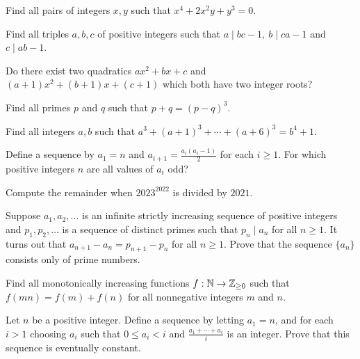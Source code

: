 \begin{problem}{\label{p:i:n:pr:71}}
  Find all pairs of integers $x,y$ such that $x^4+2x^2y+y^3=0$.
\end{problem}
\begin{problem}{\label{p:i:n:pr:72}}
  Find all triples $a,b,c$ of positive integers such that $a\mid bc-1,\
    b\mid ca-1$ and $c\mid ab-1$.
\end{problem}
\begin{problem}{\label{p:i:n:pr:73}}
  Do there exist two quadratics $ax^2+bx+c$ and $(a+1)x^2+(b+1)x+(c+1)$
    which both have two integer roots?
\end{problem}
\begin{problem}{\label{p:i:n:pr:74}}
  Find all primes $p$ and $q$ such that $p+q=(p-q)^3$.
\end{problem}
\begin{problem}{\label{p:i:n:pr:75}}
  Find all integers $a,b$ such that $a^3+(a+1)^3+\cdots+(a+6)^3=b^4+1$.
\end{problem}
\begin{problem}{\label{p:i:n:pr:76}}
    Define a sequence by $a_1=n$ and $a_{i+1}=\frac{a_i(a_i-1)}2$ for each
    $i\ge 1$. For which positive integers $n$ are all values of $a_i$ odd?
\end{problem}
\begin{problem}{\label{p:i:n:pr:76b}}
  Compute the remainder when $2023^{2022}$ is divided by $2021$.
\end{problem}
\begin{problem}{\label{p:i:n:pr:77}}
    Suppose $a_1,a_2, \dots$ is an infinite strictly increasing sequence of
      positive integers and $p_1, p_2, \dots$ is a sequence of distinct primes
      such that $p_n \mid a_n$ for all $n \ge 1$. It turns out that
      $a_{n+1}-a_n=p_{n+1}-p_n$ for all $n\ge 1$. Prove that the sequence $\{a_n\}$
      consists only of prime numbers.
\end{problem}
\begin{problem}{\label{p:i:n:pr:78}}
  Find all monotonically increasing functions $f:\mathbb{N}\to\mathbb{Z}_{\ge 0}$ such that $f(mn)=f(m)+f(n)$ for
    all nonnegative integers $m$ and $n$.
\end{problem}
\begin{problem}{\label{p:i:n:pr:79}}
  Let $n$ be a positive integer. Define a sequence by letting $a_1=n$, and
    for each $i>1$ choosing $a_i$ such that $0\le a_i<i$ and
    $\frac{a_1+\cdots+a_i}i$ is an integer. Prove that this sequence is
    eventually constant.
\end{problem}
